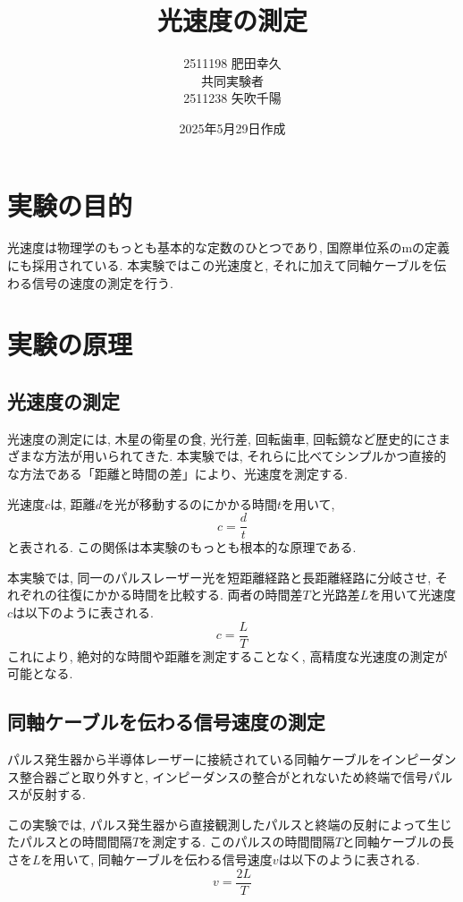 \documentclass{jarticle}
\title{光速度の測定}
\author{2511198 肥田幸久 \\ 共同実験者 \\ 2511238 矢吹千陽}
\date{2025年5月29日作成}
\begin{document}
\maketitle



\section{実験の目的}
光速度は物理学のもっとも基本的な定数のひとつであり, 国際単位系の$\mathrm{m}$の定義にも採用されている. 本実験ではこの光速度と, それに加えて同軸ケーブルを伝わる信号の速度の測定を行う.



\section{実験の原理}


\subsection{光速度の測定}

光速度の測定には, 木星の衛星の食, 光行差, 回転歯車, 回転鏡など歴史的にさまざまな方法が用いられてきた. 本実験では, それらに比べてシンプルかつ直接的な方法である「距離と時間の差」により、光速度を測定する.

光速度$c$は, 距離$d$を光が移動するのにかかる時間$t$を用いて,
\begin{equation}
  c=\frac{d}{t}
\end{equation}
と表される. この関係は本実験のもっとも根本的な原理である.

本実験では, 同一のパルスレーザー光を短距離経路と長距離経路に分岐させ, それぞれの往復にかかる時間を比較する. 両者の時間差$T$と光路差$L$を用いて光速度$c$は以下のように表される.
\begin{equation}
  c=\frac{L}{T}
\end{equation}
これにより, 絶対的な時間や距離を測定することなく, 高精度な光速度の測定が可能となる.


\subsection{同軸ケーブルを伝わる信号速度の測定}

パルス発生器から半導体レーザーに接続されている同軸ケーブルをインピーダンス整合器ごと取り外すと, インピーダンスの整合がとれないため終端で信号パルスが反射する.

この実験では, パルス発生器から直接観測したパルスと終端の反射によって生じたパルスとの時間間隔$T$を測定する.
このパルスの時間間隔$T$と同軸ケーブルの長さを$L$を用いて, 同軸ケーブルを伝わる信号速度$v$は以下のように表される.
\begin{equation}
  v=\frac{2L}{T}
\end{equation}
\end{document}
